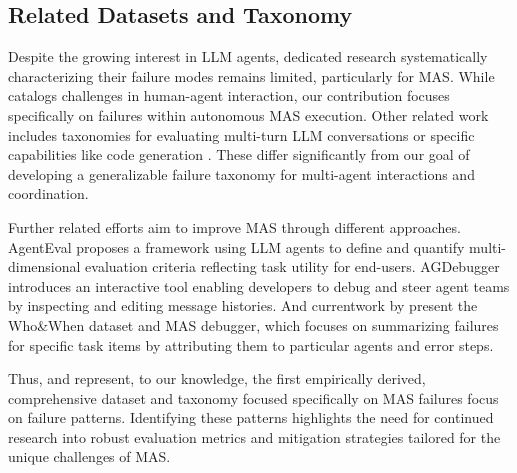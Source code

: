 \subsection{Related Datasets and Taxonomy}
Despite the growing interest in LLM agents, dedicated research systematically characterizing their failure modes remains limited, particularly for MAS. While \citet{bansal2024challenges} catalogs challenges in human-agent interaction, our contribution focuses specifically on failures within autonomous MAS execution. Other related work includes taxonomies for evaluating multi-turn LLM conversations \cite{Bai_2024} or specific capabilities like code generation \cite{SongD_code_tax}. These differ significantly from our goal of developing a generalizable failure taxonomy for multi-agent interactions and coordination. 

Further related efforts aim to improve MAS through different approaches. AgentEval \cite{arabzadeh2024assessingverifyingtaskutility} proposes a framework using LLM agents to define and quantify multi-dimensional evaluation criteria reflecting task utility for end-users. AGDebugger \cite{epperson2025interactive} introduces an interactive tool enabling developers to debug and steer agent teams by inspecting and editing message histories. And currentwork by \citet{zhang2025agentcausestaskfailures} present the Who\&When dataset and MAS debugger, which focuses on summarizing failures for specific task items by attributing them to particular agents and error steps. 

Thus, \dataset{} and \taxonomy{} represent, to our knowledge, the first empirically derived, comprehensive dataset and taxonomy focused specifically on MAS failures focus on failure patterns. Identifying these patterns highlights the need for continued research into robust evaluation metrics and mitigation strategies tailored for the unique challenges of MAS.